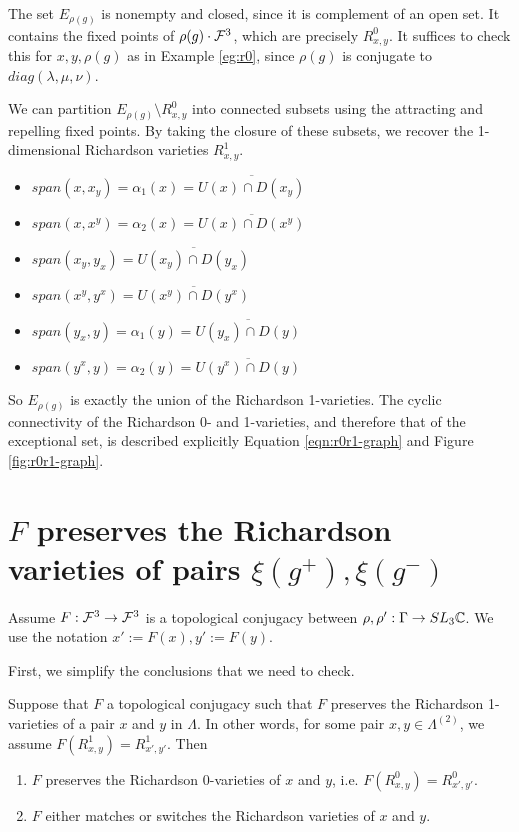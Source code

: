 The set $E_{\rho(g)}$ is nonempty and closed, since it is complement of an open set. 
It contains the fixed points of $\rho(g) \cdot \mathcal{F}^3$, which are precisely $R^0_{x,y}$.
It suffices to check this for $x,y,\rho(g)$ as in Example \ref{eg:r0}, 
since $\rho(g)$ is conjugate to $diag(\lambda, \mu, \nu)$.

We can partition $E_{\rho(g)} \setminus R^0_{x,y}$
into connected subsets using the attracting and repelling fixed points.
By taking the closure of these subsets, 
we recover the 1-dimensional Richardson varieties $R^1_{x,y}$.
\begin{itemize}
    \item $span(x, x_y) = \alpha_1(x) = \overline{U(x) \cap D(x_y)}$
    \item $span(x, x^y) = \alpha_2(x) = \overline{U(x) \cap D(x^y)}$
    \item $span(x_y,y_x) = \overline{U(x_y) \cap D(y_x)}$
    \item $span(x^y,y^x) = \overline{U(x^y) \cap D(y^x)}$
    \item $span(y_x, y) = \alpha_1(y) = \overline{U(y_x) \cap D(y)}$
    \item $span(y^x, y) = \alpha_2(y) = \overline{U(y^x) \cap D(y)}$
\end{itemize}
So $E_{\rho(g)}$ is exactly the union of the Richardson 1-varieties.
The cyclic connectivity of the Richardson 0- and 1-varieties, 
and therefore that of the exceptional set,
is described explicitly Equation \ref{eqn:r0r1-graph} and Figure \ref{fig:r0r1-graph}.

\section{$F$ preserves the Richardson varieties of pairs $\xi(g^+), \xi(g^-)$}

Assume $F:\mathcal{F}^3 \rightarrow \mathcal{F}^3$ is a topological conjugacy between 
$\rho,\rho':\Gamma \rightarrow SL_3\mathbb{C}$. 
We use the notation $x' := F(x), y' := F(y)$.

First, we simplify the conclusions that we need to check.
\begin{proposition}\label{prop:simplify}
    Suppose that $F$ a topological conjugacy such that 
    $F$ preserves the Richardson 1-varieties of a pair $x$ and $y$ in $\Lambda$.
    In other words, for some pair $x,y \in \Lambda^{(2)}$, 
    we assume $F(R^1_{x,y}) = R^1_{x',y'}$.
    Then
    \begin{enumerate}
        \item $F$ preserves the Richardson 0-varieties of $x$ and $y$, i.e. $F(R^0_{x,y}) = R^0_{x',y'}$.
        \item $F$ either matches or switches the Richardson varieties of $x$ and $y$.
    \end{enumerate}
\end{proposition}

